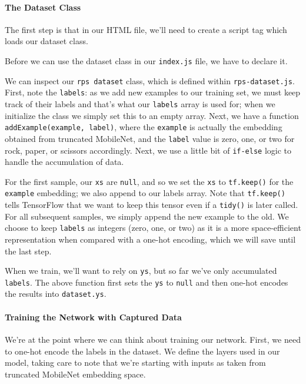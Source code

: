 \documentclass[12pt]{article}
\begin{document}
\paragraph{The Dataset Class} The first step is that in our HTML file, we'll need to create a script tag which loads our dataset class.

Before we can use the dataset class in our \texttt{index.js} file, we have to declare it.

We can inspect our \texttt{rps dataset} class, which is defined within \texttt{rps-dataset.js}. First, note the \texttt{labels}: as we add new examples to our training set, we must keep track of their labels and that's what our \texttt{labels} array is used for; when we initialize the class we simply set this to an empty array. Next, we have a function \texttt{addExample(example, label)}, where the \texttt{example} is actually the embedding obtained from truncated MobileNet, and the \texttt{label} value is zero, one, or two for rock, paper, or scissors accordingly. Next, we use a little bit of \texttt{if-else} logic to handle the accumulation of data.

For the first sample, our \texttt{xs} are \texttt{null}, and so we set the \texttt{xs} to \texttt{tf.keep()} for the \texttt{example} embedding; we also append to our labels array. Note that \texttt{tf.keep()} tells TensorFlow that we want to keep this tensor even if a \texttt{tidy()} is later called. For all subsequent samples, we simply append the new example to the old. We choose to keep \texttt{labels} as integers (zero, one, or two) as it is a more space-efficient representation when compared with a one-hot encoding, which we will save until the last step.

When we train, we'll want to rely on \texttt{ys}, but so far we've only accumulated \texttt{labels}. The above function first sets the \texttt{ys} to \texttt{null} and then one-hot encodes the results into \texttt{dataset.ys}.

\paragraph{Training the Network with Captured Data}
We're at the point where we can think about training our network. First, we need to one-hot encode the labels in the dataset. We define the layers used in our model, taking care to note that we're starting with inputs as taken from truncated MobileNet embedding space.

\end{document}

